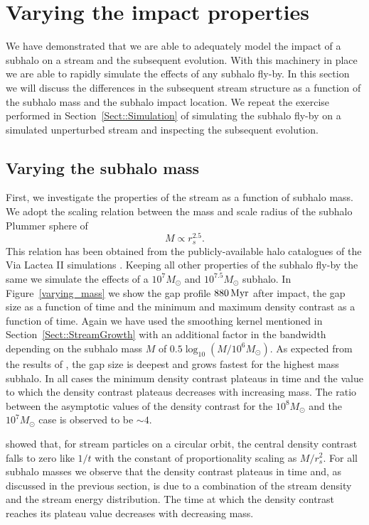 \documentclass[useAMS,usenatbib,fleqn,a4paper]{mn2e}
\def\Myr{\,{\rm Myr}}
\begin{document}
\section{Varying the impact properties}\label{Sect::Variation}
We have demonstrated that we are able to adequately model the impact of a subhalo on a stream and the subsequent evolution. With this machinery in place we are able to rapidly simulate the effects of any subhalo fly-by. In this section we will discuss the differences in the subsequent stream structure as a function of the subhalo mass and the subhalo impact location. We repeat the exercise performed in Section~\ref{Sect::Simulation} of simulating the subhalo fly-by on a simulated unperturbed stream and inspecting the subsequent evolution.

\subsection{Varying the subhalo mass}
First, we investigate the properties of the stream as a function of subhalo mass. We adopt the scaling relation between the mass and scale radius of the subhalo Plummer sphere of
\begin{equation}
M\propto r_s^{2.5}.
\end{equation}
This relation has been obtained from the publicly-available halo catalogues of the Via Lactea II simulations \citep{Diemand2008}. Keeping all other properties of the subhalo fly-by the same we simulate the effects of a $10^7M_\odot$ and $10^{7.5}M_\odot$ subhalo. In Figure~\ref{varying_mass} we show the gap profile $880\Myr$ after impact, the gap size as a function of time and the minimum and maximum density contrast as a function of time. Again we have used the smoothing kernel mentioned in Section~\ref{Sect::StreamGrowth} with an additional factor in the bandwidth depending on the subhalo mass $M$ of $0.5\log_{10}(M/10^6M_\odot)$. As expected from the results of \cite{ErkalBelokurov2015}, the gap size is deepest and grows fastest for the highest mass subhalo. In all cases the minimum density contrast plateaus in time and the value to which the density contrast plateaus decreases with increasing mass. The ratio between the asymptotic values of the density contrast for the $10^8M_\odot$ and the $10^7M_\odot$ case is observed to be $\sim4$.

\cite{ErkalBelokurov2015} showed that, for stream particles on a circular orbit, the central density contrast falls to zero like $1/t$ with the constant of proportionality scaling as $M/r_s^2$. For all subhalo masses we observe that the density contrast plateaus in time and, as discussed in the previous section, is due to a combination of the stream density and the stream energy distribution. The time at which the density contrast reaches its plateau value decreases with decreasing mass.
\end{document}
